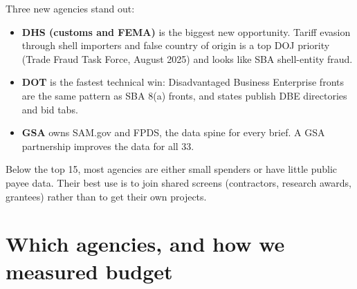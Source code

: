 \documentclass[letterpaper,11pt]{article}
\providecommand{\tightlist}{\setlength{\itemsep}{0pt}\setlength{\parskip}{0pt}}
\begin{document}
Three new agencies stand out:

\begin{itemize}
\tightlist
\item
  \textbf{DHS (customs and FEMA)} is the biggest new opportunity. Tariff
  evasion through shell importers and false country of origin is a top
  DOJ priority (Trade Fraud Task Force, August 2025) and looks like SBA
  shell-entity fraud.
\item
  \textbf{DOT} is the fastest technical win: Disadvantaged Business
  Enterprise fronts are the same pattern as SBA 8(a) fronts, and states
  publish DBE directories and bid tabs.
\item
  \textbf{GSA} owns SAM.gov and FPDS, the data spine for every brief. A
  GSA partnership improves the data for all 33.
\end{itemize}

Below the top 15, most agencies are either small spenders or have little
public payee data. Their best use is to join shared screens
(contractors, research awards, grantees) rather than to get their own
projects.

\hypertarget{which-agencies-and-how-we-measured-budget}{%
\section{Which agencies, and how we measured
budget}\label{which-agencies-and-how-we-measured-budget}}
\end{document}
